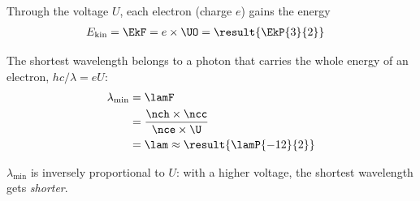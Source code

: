 \begin{abcliste}
\abc Through the voltage $U$, each electron (charge $e$) gains the energy
\begin{align}
 E_\mathrm{kin} &= \EkF = e\times\UO = \result{\EkP{3}{2}}
\end{align}

\abc The shortest wavelength belongs to a photon that carries the whole energy of an electron, $h c/\lambda = e U$:
\begin{align}
 \lambda_\mathrm{min} &= \lamF \\
   &= \frac{\nch\times\ncc}{\nce\times\U} \\
   &= \lam \approx \result{\lamP{-12}{2}}
\end{align}

\abc $\lambda_\mathrm{min}$ is inversely proportional to $U$: with a higher voltage, the shortest wavelength gets \emph{shorter}.
\end{abcliste}
